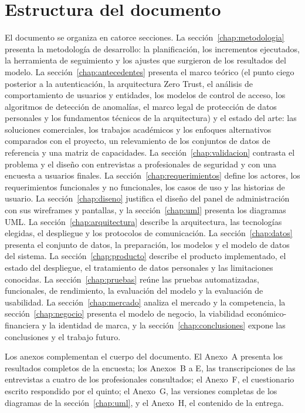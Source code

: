 \section{Estructura del documento}
El documento se organiza en catorce secciones. La sección~\ref{chap:metodologia} presenta la
metodología de desarrollo: la planificación, los incrementos ejecutados, la herramienta de seguimiento
y los ajustes que surgieron de los resultados del modelo. La sección~\ref{chap:antecedentes} presenta el marco
teórico (el punto ciego posterior a la autenticación, la arquitectura Zero Trust, el análisis de
comportamiento de usuarios y entidades, los modelos de control de acceso, los algoritmos de detección
de anomalías, el marco legal de protección de datos personales y los fundamentos técnicos de la arquitectura) y el estado del arte: las soluciones
comerciales, los trabajos académicos y los enfoques alternativos comparados con el proyecto, un relevamiento de los conjuntos de datos de referencia y una matriz de capacidades. La sección~\ref{chap:validacion} contrasta el problema y el diseño con entrevistas a profesionales de seguridad y con una encuesta a
usuarios finales.
 La sección~\ref{chap:requerimientos} define los actores, los requerimientos
funcionales y no funcionales, los casos de uso y las historias de usuario. La
sección~\ref{chap:diseno} justifica el diseño del panel de administración con sus wireframes y
pantallas, y la sección~\ref{chap:uml} presenta los diagramas UML.
La sección~\ref{chap:arquitectura} describe la arquitectura, las tecnologías elegidas, el despliegue y
los protocolos de comunicación. La sección~\ref{chap:datos} presenta el conjunto de datos, la
preparación, los modelos y el modelo de datos del sistema. La sección~\ref{chap:producto} describe
el producto implementado, el estado del despliegue, el tratamiento de datos personales y
las limitaciones conocidas. La sección~\ref{chap:pruebas} reúne las pruebas automatizadas, funcionales,
de rendimiento, la evaluación del modelo y la evaluación de usabilidad. La
sección~\ref{chap:mercado} analiza el mercado y la competencia, la sección~\ref{chap:negocio}
presenta el modelo de negocio, la viabilidad económico-financiera y la identidad de marca, y la
sección~\ref{chap:conclusiones} expone las conclusiones y el trabajo futuro.

Los anexos complementan el cuerpo del documento. El Anexo~A presenta los resultados completos de la
encuesta; los Anexos~B a E, las transcripciones de las entrevistas a cuatro de los profesionales
consultados; el Anexo~F, el cuestionario escrito respondido por el quinto; el Anexo~G, las
versiones completas de los diagramas de la sección~\ref{chap:uml}, y el Anexo~H, el contenido de
la entrega.
